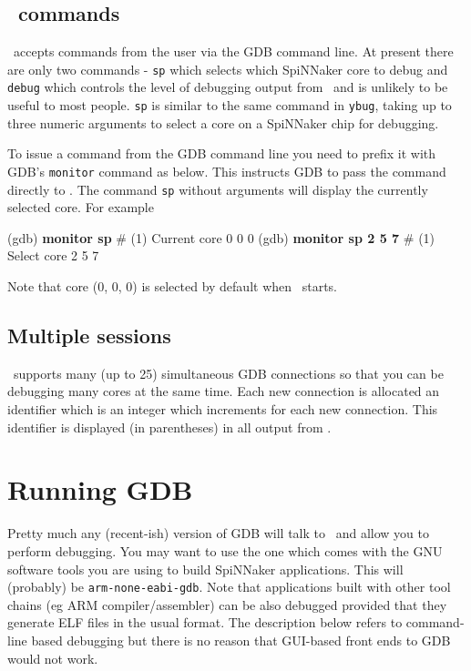 \subsection{\gdbspin\ commands}

\gdbspin\ accepts commands from the user via the GDB command
line. At present there are only two commands -
\texttt{sp} which selects which SpiNNaker core to debug and
\texttt{debug} which controls the level of debugging output from
\gdbspin\ and is unlikely to be useful to most people.
\texttt{sp} is similar to the same command in \texttt{ybug}, taking
up to three numeric arguments to select a core on a SpiNNaker chip
for debugging.

To issue a command from the GDB command line you need to prefix it
with GDB's \texttt{monitor} command as below. This instructs GDB to
pass the command directly to \gdbspin. The command \texttt{sp} without
arguments will display the currently selected core. For example

\begin{shell}
(gdb) \textbf{monitor sp}
#  (1) Current core 0 0 0
(gdb) \textbf{monitor sp 2 5 7}
#  (1) Select core 2 5 7
\end{shell}

Note that core (0, 0, 0) is selected by default when \gdbspin\
starts.

\subsection{Multiple sessions}

\gdbspin\ supports many (up to 25) simultaneous GDB connections
so that you can be debugging many cores at the same time. Each new
connection is allocated an identifier which is an integer which
increments for each new connection. This identifier is displayed
(in parentheses) in all output from \gdbspin.

\section{Running GDB}

Pretty much any (recent-ish) version of GDB will talk to \gdbspin\ and
allow you to perform debugging.  You may want to use the one which
comes with the GNU software tools you are using to build SpiNNaker
applications. This will (probably) be \texttt{arm-none-eabi-gdb}.
Note that applications built with other tool chains (eg ARM
compiler/assembler) can be also debugged provided that they generate
ELF files in the usual format. The description below refers to
command-line based debugging but there is no reason that GUI-based
front ends to GDB would not work.

